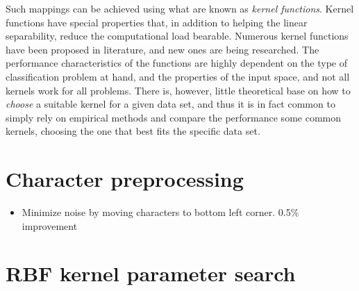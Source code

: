 \documentclass{netsec2012}
\begin{document}
Such mappings can be achieved using what are known as \emph{kernel functions}.  Kernel functions
have special properties that, in addition to helping the linear separability, reduce the
computational load bearable.  Numerous kernel functions have been proposed in literature, and new
ones are being researched.  The performance characteristics of the functions are highly dependent on
the type of classification problem at hand, and the properties of the input space, and not all
kernels work for all problems.  There is, however, little theoretical base on how to \emph{choose} a
suitable kernel for a given data set, and thus it is in fact common to simply rely on empirical
methods and compare the performance some common kernels, choosing the one that best fits the
specific data set.

%
%
%

\section{Character preprocessing}

\begin{itemize}
\item Minimize noise by moving characters to bottom left corner. 0.5\% improvement
\end{itemize}

\section{RBF kernel parameter search}
\end{document}
